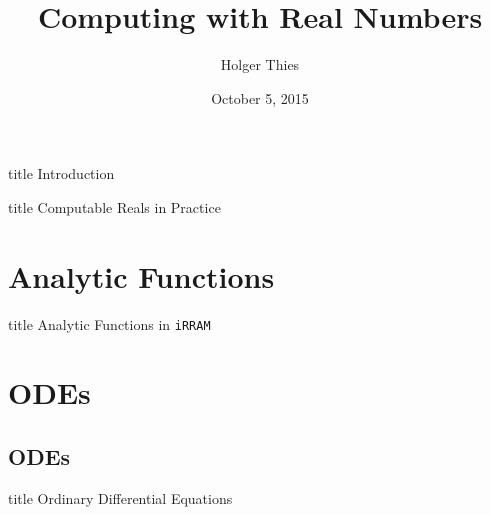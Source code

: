 \documentclass[xcolor=pdftex,dvipsnames,table]{beamer}
\title[Computing with Reals]{Computing with Real Numbers}
\author[ H. Thies]{
		Holger Thies 
}
\institute[The University of Tokyo]{
The University of Tokyo
}
\newcommand{\irram}{\texttt{iRRAM}\xspace}
\begin{document}
\date{October 5, 2015}
\frame{
\titlepage
}
\begin{frame}
	\begin{beamercolorbox}[sep=8pt,center,shadow=true,rounded=true]{title}
	Introduction\par%
    \end{beamercolorbox}
\vfill
\end{frame}


\begin{frame}
	\begin{beamercolorbox}[sep=8pt,center,shadow=true,rounded=true]{title}
	Computable Reals in Practice\par%
    \end{beamercolorbox}
\vfill
\end{frame}

\section{Analytic Functions}
\begin{frame}
	\begin{beamercolorbox}[sep=8pt,center,shadow=true,rounded=true]{title}
	Analytic Functions in \irram \par%
    \end{beamercolorbox}
\vfill
\end{frame}



\section{ODEs}
\subsection{ODEs}
\begin{frame}
	\begin{beamercolorbox}[sep=8pt,center,shadow=true,rounded=true]{title}
	Ordinary Differential Equations\par%
    \end{beamercolorbox}
\vfill
\end{frame}

\end{document}
